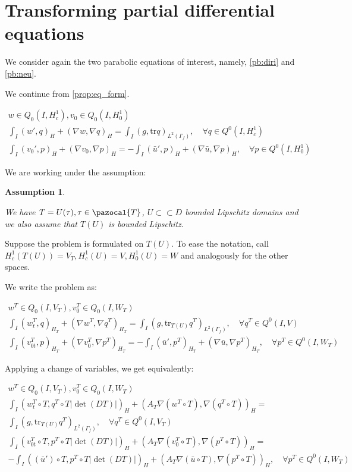 \documentclass[english,a4paper,12pt,oneside]{scrbook}
\theoremstyle{break}
\newtheorem{ass}[equation]{Assumption}
\theoremstyle{remark}
\newcommand{\tr}{\text{tr}}
\newcommand{\cc}{\subset\subset}
\newcommand{\cT}{\pazocal{T}}
\begin{document}
\section{Transforming partial differential equations}

We consider again the two parabolic equations of interest, namely, \cref{pb:diri} and \cref{pb:neu}.

We continue from \cref{prop:eq_form}.

\begin{align*}
w \in Q_0(I, H^1_c), v_0 \in Q_0(I,H^1_0) \\
\int_I ( w' , q)_H+ (\nabla w, \nabla q)_H = \int_I(g,\tr q)_{L^2(\Gamma_f)}, \quad \forall q \in Q^0(I, H^1_c) \\
\int_I (v_0',p)_H + (\nabla v_0, \nabla p)_H= -\int_I(\bar{u}',p)_H+(\nabla \bar{u}, \nabla p)_H, \quad \forall p \in Q^0(I, H^1_0) 
\end{align*}

We are working under the assumption:

\begin{ass}
\label{ass:pull}

We have $T=U(\tau), \tau \in \cT$, $U\cc D$ bounded Lipschitz domains and we also assume that $T(U)$ is bounded Lipschitz.
\end{ass}

Suppose the problem is formulated on $T(U)$. To ease the notation, call $H^1_c(T(U))=V_T, H^1_c(U)=V, H^1_0(U)=W$ and analogously for the other spaces.

We write the problem as:

\begin{align*}
w^T \in Q_0(I, V_T), v_0^T \in Q_0(I,W_T) \\
\int_I  (w^T_t , q)_{H_T}+ (\nabla w^T, \nabla q^T)_{H_T} = \int_I(g,\tr_{T(U)} q^T)_{L^2(\Gamma_f)}, \quad \forall q^T \in Q^0(I, V) \\
\int_I (v^T_{0t},p)_{H_T} + (\nabla v_0^T, \nabla p^T)_{H_T}= -\int_I(\bar{u}',p^T)_{H_T}+(\nabla \bar{u}, \nabla p^T)_{H_T}, \quad \forall p^T \in Q^0(I, W_T)
\end{align*}

Applying a change of variables, we get equivalently:

\begin{align*}
w^T \in Q_0(I, V_T), v_0^T \in Q_0(I,W_T) \\
\int_I (w^T_t\circ T, q^T\circ T |\det(DT)|)_H+ (A_T\nabla (w^T\circ T), \nabla( q^T\circ T))_{H} =\\ \int_I(g,\tr_{T(U)} q^T)_{L^2(\Gamma_f)}, \quad \forall q^T \in Q^0(I, V_T) \\
\int_I(v_{0t}^T\circ T,p^T\circ T |\det(DT)|)_H + (A_T \nabla (v_0^T\circ T), \nabla( p^T\circ T))_{H}=\\ -\int_I((\bar{u}')\circ T,p^T\circ T |\det(DT)|)_{H}+(A_T \nabla (\bar{u} \circ T), \nabla (p^T\circ T))_{H}, \quad \forall p^T \in Q^0(I, W_T)
\end{align*}
\end{document}
